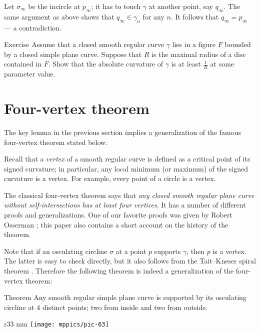 \documentclass{article}
\begin{document}
Let $\sigma_\infty$ be the incircle at $p_\infty$; it has to touch $\gamma$ at another point, say $q_\infty$.
The same argument as above shows that $q_\infty\in\gamma_n$ for any $n$.
It follows that $q_\infty =p_\infty$ --- a contradiction.
\qeds

\begin{thm}{Exercise}\label{ex:moon-rad}
Assume that a closed smooth regular curve $\gamma$ lies in a figure $F$ bounded by a closed simple plane curve.
Suppose that $R$ is the maximal radius of a disc contained in $F$.
Show that the absolute curvature of $\gamma$ is at least $\tfrac1R$ at some parameter value.
\end{thm}


\section*{Four-vertex theorem}


The key lemma in the previous section implies a generalization of the famous four-vertex theorem stated below.

Recall that a \emph{vertex} of a smooth regular curve is defined as a critical point of its signed curvature;
in particular, any local minimum (or maximum) of the signed curvature is a vertex.
For example, every point of a circle is a vertex.

The classical four-vertex theorem says that \emph{any closed smooth regular plane curve without self-intersections has at least four vertices}.
It has a number of different proofs and generalizations.
One of our favorite proofs was given by Robert Osserman \cite{osserman}; this paper also contains a short account on the history of the theorem.

Note that if an osculating circline $\sigma$ at a point $p$ supports $\gamma$, then $p$ is a vertex.
The latter is easy to check directly, but it also follows from the Tait--Kneser spiral theorem \cite{ghys-tabachnikov-timorin}.
Therefore the following theorem is indeed a generalization of the four-vertex theorem:

\begin{thm}{Theorem}\label{thm:4-vert}
Any smooth regular simple plane curve is supported by its osculating circline at 4 distinct points; two from inside and two from outside.
\end{thm}

\begin{wrapfigure}{r}{33 mm}
\vskip-0mm
\centering
\texttt{[image: mppics/pic-63]}
\vskip0mm
\end{wrapfigure}
\end{document}
